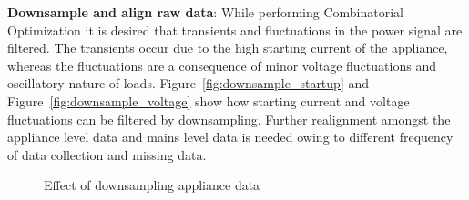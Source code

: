 \documentclass[conference]{IEEEtran}
\newcommand{\figref}[1]{Figure~\ref{#1}}
\begin{document}
\textbf{Downsample and align raw data}: While performing Combinatorial Optimization it is desired that transients and fluctuations in the power signal are filtered. The transients occur due to the high starting current of the appliance, whereas the fluctuations are a consequence of minor voltage fluctuations and oscillatory nature of loads. \figref{fig:downsample_startup} and \figref{fig:downsample_voltage} show how starting current and voltage fluctuations can be filtered by downsampling. 
Further realignment amongst the appliance level data and mains level data is needed owing to different frequency of data collection and missing data.
\begin{figure} 
	
  	\caption{Effect of downsampling appliance data}
    \label{fig:downsampling}
\end{figure}
\end{document}
